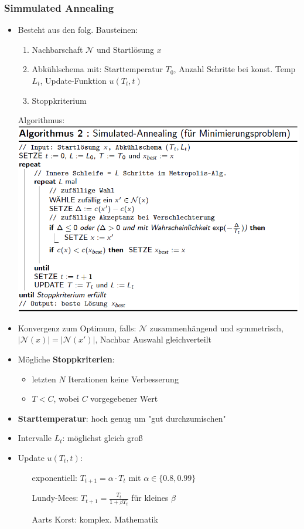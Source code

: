 \documentclass[12pt]{article}
\begin{document}
			\subsubsection{Simmulated Annealing}
				\begin{itemize}
					\item Besteht aus den folg. Bausteinen:
						\begin{enumerate}
							\item Nachbarschaft $\mathcal{N}$ und Startlösung $x$
							\item Abkühlschema mit: Starttemperatur $T_0$, Anzahl Schritte bei konst. Temp $L_t$, Update-Funktion $u(T_t,t)$
							\item Stoppkriterium
						\end{enumerate}
					\item[] Algorithmus:\\
						\includegraphics[scale=0.6]{SAAlgo}
					\item Konvergenz zum Optimum, falls: $\mathcal{N}$ zusammenhängend und symmetrisch, $|\mathcal{N}(x)|=|\mathcal{N}(x')|$, Nachbar Auswahl gleichverteilt
					\item Mögliche \textbf{Stoppkriterien}:
						\begin{itemize}
							\item letzten $N$ Iterationen keine Verbesserung
							\item $T<C$, wobei $C$ vorgegebener Wert
						\end{itemize}
					\item \textbf{Starttemperatur}: hoch genug um "gut durchzumischen"
					\item Intervalle $L_t$: möglichst gleich groß
					\item Update $u(T_t, t)$: 
						\begin{itemize}
							\item[exponentiell:] $T_{t+1}=\alpha\cdot T_t$ mit $\alpha\in\{0.8,0.99\}$
							\item[Lundy-Mees:] $T_{t+1}=\frac{T_t}{1+\beta T_t}$ für kleines $\beta$
							\item[Aarts Korst:] komplex. Mathematik
						\end{itemize}
				\end{itemize}
\end{document}
